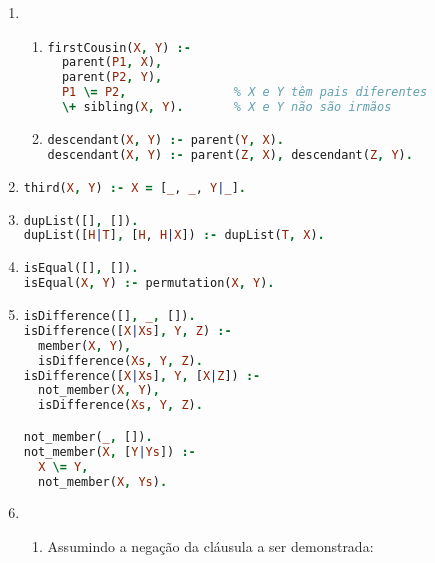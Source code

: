 \documentclass{article}
\begin{document}
    \begin{enumerate}
        \item 
            \begin{enumerate}
                \item 
\begin{lstlisting}[language=prolog]
firstCousin(X, Y) :-
  parent(P1, X),
  parent(P2, Y),
  P1 \= P2,               % X e Y têm pais diferentes
  \+ sibling(X, Y).       % X e Y não são irmãos
\end{lstlisting}    

                \item 
\begin{lstlisting}[language=prolog]
descendant(X, Y) :- parent(Y, X).
descendant(X, Y) :- parent(Z, X), descendant(Z, Y).
\end{lstlisting}
            \end{enumerate}

            \item 
\begin{lstlisting}[language=prolog]
third(X, Y) :- X = [_, _, Y|_].
\end{lstlisting}

            \item 
\begin{lstlisting}[language=prolog]
dupList([], []).
dupList([H|T], [H, H|X]) :- dupList(T, X).
\end{lstlisting}

            \item 
\begin{lstlisting}[language=prolog]
isEqual([], []).
isEqual(X, Y) :- permutation(X, Y).
\end{lstlisting}

            \item 
\begin{lstlisting}[language=prolog]
isDifference([], _, []).
isDifference([X|Xs], Y, Z) :-
  member(X, Y),
  isDifference(Xs, Y, Z).
isDifference([X|Xs], Y, [X|Z]) :-
  not_member(X, Y),
  isDifference(Xs, Y, Z).

not_member(_, []).
not_member(X, [Y|Ys]) :-
  X \= Y,
  not_member(X, Ys).
\end{lstlisting}
            \item 
                \begin{enumerate}[I]
                    \item 
                        Assumindo a negação da cláusula a ser demonstrada: 


\end{enumerate}
\end{enumerate}
\end{document}
